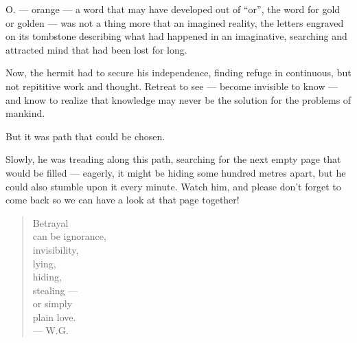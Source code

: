 O. --- orange --- a word that may have developed out of \enquote{or}, the word for gold or golden --- was not a thing more that an imagined reality, the letters engraved on its tombstone describing what had happened in an imaginative, searching and attracted mind that had been lost for long.

Now, the hermit had to secure his independence, finding refuge in continuous, but not repititive work and thought. Retreat to see --- become invisible to know --- and know to realize that knowledge may never be the solution for the problems of mankind.

But it was path that could be chosen.

Slowly, he was treading along this path, searching for the next empty page that would be filled --- eagerly, it might be hiding some hundred metres apart, but he could also stumble upon it every minute. 
Watch him, and please don't forget to come back so we can have a look at that page together!

\begin{quote}
Betrayal \\
can be ignorance, \\
invisibility, \\
lying, \\
hiding, \\
stealing --- \\
or simply \\
plain love. \\
--- W.G.
\end{quote}

